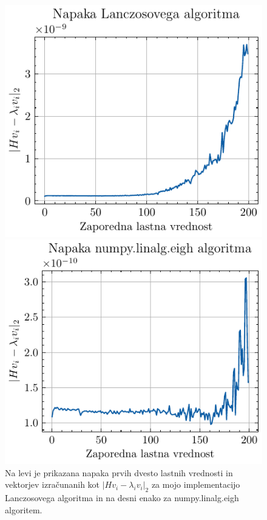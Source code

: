 \documentclass[slovene,11pt,a4paper]{article}
\begin{document}
\begin{figure}[ht]
  \centering
  \begin{minipage}{0.48\textwidth}
    \centering
    \includegraphics[width=\linewidth]{graphs/errlanz.pdf}
    
  \end{minipage}%
  \hfill%
  \begin{minipage}{0.48\textwidth}
    \centering
    \includegraphics[width=\linewidth]{graphs/errnumpy.pdf}
    
  \end{minipage}
  \caption{Na levi je prikazana napaka prvih dvesto lastnih vrednosti in vektorjev izračunanih kot $|Hv_i - \lambda_iv_i|_2$ za mojo implementacijo Lanczosovega algoritma in na desni enako za numpy.linalg.eigh algoritem.}
  \label{fig: err lanz}
\end{figure}
\end{document}
